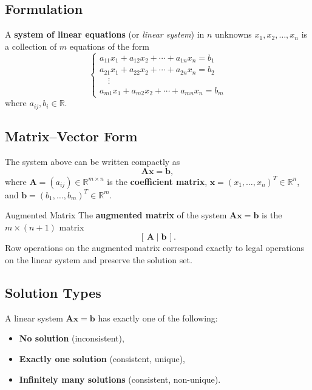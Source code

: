 \documentclass[12pt,a4paper]{article}
\newcommand{\R}{\mathbb{R}}
\newcommand{\vv}[1]{\mathbf{#1}}
\newcommand{\mat}[1]{\mathbf{#1}}
\begin{document}
	\subsection{Formulation}
	
	A \textbf{system of linear equations} (or \emph{linear system}) in \(n\) unknowns
	\(x_1, x_2, \ldots, x_n\) is a collection of \(m\) equations of the form
	\[
	\begin{cases}
		a_{11}x_1 + a_{12}x_2 + \cdots + a_{1n}x_n = b_1\\
		a_{21}x_1 + a_{22}x_2 + \cdots + a_{2n}x_n = b_2\\
		\quad\vdots\\
		a_{m1}x_1 + a_{m2}x_2 + \cdots + a_{mn}x_n = b_m
	\end{cases}
	\]
	where \(a_{ij}, b_i \in \R\).
	
	\subsection{Matrix--Vector Form}
	
	The system above can be written compactly as
	\[
	\mat{A}\vv{x} = \vv{b},
	\]
	where \(\mat{A} = (a_{ij}) \in \R^{m \times n}\) is the \textbf{coefficient matrix},
	\(\vv{x} = (x_1, \ldots, x_n)^T \in \R^n\), and \(\vv{b} = (b_1, \ldots, b_m)^T \in \R^m\).
	
	\begin{defbox}{Augmented Matrix}{}
		The \textbf{augmented matrix} of the system \(\mat{A}\vv{x} = \vv{b}\) is the
		\(m \times (n+1)\) matrix
		\[
		[\,\mat{A} \mid \vv{b}\,].
		\]
		Row operations on the augmented matrix correspond exactly to legal operations on the
		linear system and preserve the solution set.
	\end{defbox}
	
	\subsection{Solution Types}
	
	A linear system \(\mat{A}\vv{x} = \vv{b}\) has exactly one of the following:
	\begin{itemize}[leftmargin=2em, itemsep=2pt]
		\item \textbf{No solution} (inconsistent),
		\item \textbf{Exactly one solution} (consistent, unique),
		\item \textbf{Infinitely many solutions} (consistent, non-unique).
	\end{itemize}
	
\end{document}
